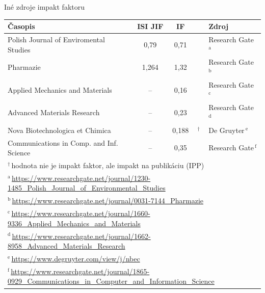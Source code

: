 \documentclass{beamer}
\begin{document}
\begin{frame}{Iné zdroje impakt faktoru}
  \begin{table}
    \footnotesize
    \begin{tabular}{lcc@{\,}ll}
      \toprule
      Časopis & ISI JIF & IF &  & Zdroj \\
      \midrule
      Polish Journal of Enviromental Studies   & 0,79\phantom{0} & 0,71\phantom{0}&           & Research Gate\,$^{\mathrm{a}}$ \\[0.5ex]
      Pharmazie                                & 1,264           & 1,32\phantom{0}&           & Research Gate\,$^{\mathrm{b}}$ \\[0.5ex]
      Applied Mechanics and Materials          & --              & 0,16\phantom{0}&           & Research Gate\,$^{\mathrm{c}}$ \\[0.5ex]
      Advanced Materials Research              & --              & 0,23\phantom{0}&           & Research Gate\,$^{\mathrm{d}}$ \\[0.5ex]
      Nova Biotechnologica et Chimica          & --              & 0,188          &$^\dagger$ & De Gruyter\,$^{\mathrm{e}}$    \\[0.5ex]
      Communications in Comp. and Inf. Science & --              & 0,35\phantom{0}&           & Research Gate\,$^{\mathrm{f}}$ \\[0.5ex]
      \bottomrule
      \multicolumn{5}{l}{\tiny $^\dagger$\,hodnota nie je impakt faktor, ale impakt na publikáciu (IPP)} \\
      \multicolumn{5}{l}{\tiny $^{\mathrm{a}}$\,\url{https://www.researchgate.net/journal/1230-1485\_Polish\_Journal\_of\_Environmental\_Studies}} \\
      \multicolumn{5}{l}{\tiny $^{\mathrm{b}}$\,\url{https://www.researchgate.net/journal/0031-7144\_Pharmazie}} \\
      \multicolumn{5}{l}{\tiny $^{\mathrm{c}}$\,\url{https://www.researchgate.net/journal/1660-9336\_Applied\_Mechanics\_and\_Materials}} \\
      \multicolumn{5}{l}{\tiny $^{\mathrm{d}}$\,\url{https://www.researchgate.net/journal/1662-8958\_Advanced\_Materials\_Research}} \\
      \multicolumn{5}{l}{\tiny $^{\mathrm{e}}$\,\url{https://www.degruyter.com/view/j/nbec}} \\
      \multicolumn{5}{l}{\tiny $^{\mathrm{f}}$\,\url{https://www.researchgate.net/journal/1865-0929\_Communications\_in\_Computer\_and\_Information\_Science}} \\
    \end{tabular}
  \end{table}
\end{frame}
\end{document}
